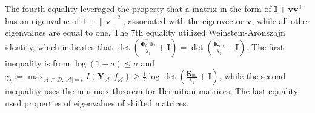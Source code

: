 The fourth equality leveraged the property that a matrix in the form of $\mathbf{I} + \mathbf{v}\mathbf{v}^\top$ has an eigenvalue of $1 + \lVert \mathbf{v} \rVert^2$, associated with the eigenvector $\mathbf{v}$, while all other eigenvalues are equal to one. The 7th equality utilized Weinstein-Aronszajn identity, which indicates that $\det(\frac{\boldsymbol{\Phi}_t^\top \boldsymbol{\Phi}_t}{\lambda_1} + \mathbf{I}) = \det(\frac{\mathbf{K}_{uu}}{\lambda_1} + \mathbf{I})$. The first inequality is from $\log(1+a) \le a$ and $\gamma_t := \max_{\mathcal{A} \subset \mathcal{D}: \lvert \mathcal{A} \rvert=t} I(\mathbf{Y}_\mathcal{A}; f_\mathcal{A}) \ge \frac{1}{2}\log \det(\frac{\mathbf{K}_{uu}}{\lambda_1} + \mathbf{I})$, while the second inequality uses the min-max theorem for Hermitian matrices. The last equality used properties of eigenvalues of shifted matrices. 




